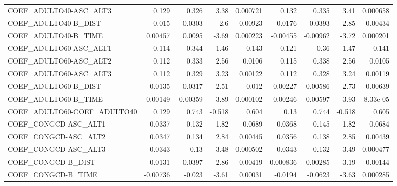 \begin{tabular}{lrrrrrrrr}
COEF\_ADULTO40-ASC\_ALT3            &       0.129 &        0.326 &     3.38 & 0.000721 &      0.132 &       0.335 &         3.41 &      0.000658 \\
COEF\_ADULTO40-B\_DIST              &       0.015 &       0.0303 &      2.6 &  0.00923 &     0.0176 &      0.0393 &         2.85 &       0.00434 \\
COEF\_ADULTO40-B\_TIME              &     0.00457 &       0.0095 &    -3.69 & 0.000223 &   -0.00455 &    -0.00962 &        -3.72 &      0.000201 \\
COEF\_ADULTO60-ASC\_ALT1            &       0.114 &        0.344 &     1.46 &    0.143 &      0.121 &        0.36 &         1.47 &         0.141 \\
COEF\_ADULTO60-ASC\_ALT2            &       0.112 &        0.333 &     2.56 &   0.0106 &      0.115 &       0.338 &         2.56 &        0.0105 \\
COEF\_ADULTO60-ASC\_ALT3            &       0.112 &        0.329 &     3.23 &  0.00122 &      0.112 &       0.328 &         3.24 &       0.00119 \\
COEF\_ADULTO60-B\_DIST              &      0.0135 &       0.0317 &     2.51 &    0.012 &    0.00227 &     0.00586 &         2.73 &       0.00639 \\
COEF\_ADULTO60-B\_TIME              &    -0.00149 &     -0.00359 &    -3.89 & 0.000102 &   -0.00246 &    -0.00597 &        -3.93 &      8.33e-05 \\
COEF\_ADULTO60-COEF\_ADULTO40       &       0.129 &        0.743 &   -0.518 &    0.604 &       0.13 &       0.744 &       -0.518 &         0.605 \\
COEF\_CONGCD-ASC\_ALT1              &      0.0337 &        0.132 &     1.82 &   0.0689 &     0.0368 &       0.145 &         1.82 &        0.0684 \\
COEF\_CONGCD-ASC\_ALT2              &      0.0347 &        0.134 &     2.84 &  0.00445 &     0.0356 &       0.138 &         2.85 &       0.00439 \\
COEF\_CONGCD-ASC\_ALT3              &      0.0343 &         0.13 &     3.48 & 0.000502 &     0.0343 &       0.132 &         3.49 &      0.000477 \\
COEF\_CONGCD-B\_DIST                &     -0.0131 &      -0.0397 &     2.86 &  0.00419 &   0.000836 &     0.00285 &         3.19 &       0.00144 \\
COEF\_CONGCD-B\_TIME                &    -0.00736 &       -0.023 &    -3.61 &  0.00031 &    -0.0194 &     -0.0623 &        -3.63 &      0.000285 \\

\end{tabular}
